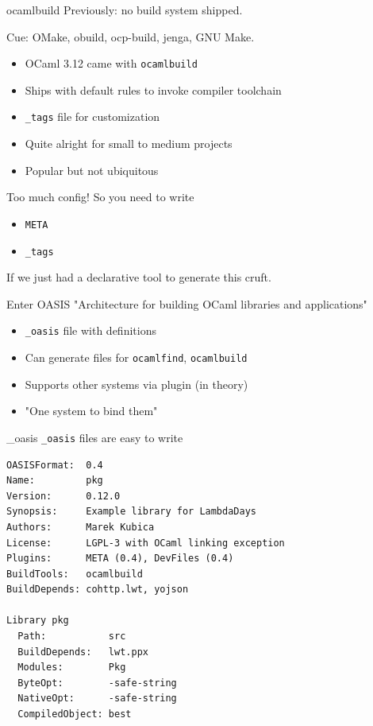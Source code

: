 \documentclass{beamer}
\begin{document}
\begin{frame}{ocamlbuild}
  Previously: no build system shipped.

  Cue: OMake, obuild, ocp-build, jenga, GNU Make.

  \begin{itemize}
    \item OCaml 3.12 came with \texttt{ocamlbuild}
    \item Ships with default rules to invoke compiler toolchain
    \item \texttt{\_tags} file for customization
    \item Quite alright for small to medium projects
    \item Popular but not ubiquitous
  \end{itemize}
\end{frame}

\begin{frame}{Too much config!}
  So you need to write

  \begin{itemize}
    \item \texttt{META}
    \item \texttt{\_tags}
  \end{itemize}

  If we just had a declarative tool to generate this cruft.
\end{frame}

\begin{frame}{Enter OASIS}
  "Architecture for building OCaml libraries and applications"

  \begin{itemize}
    \item \texttt{\_oasis} file with definitions
    \item Can generate files for \texttt{ocamlfind}, \texttt{ocamlbuild}
    \item Supports other systems via plugin (in theory)
    \item "One system to bind them"
  \end{itemize}
\end{frame}

\begin{frame}[fragile]{\_oasis}
  \texttt{\_oasis} files are easy to write
  \begin{verbatim}
OASISFormat:  0.4
Name:         pkg
Version:      0.12.0
Synopsis:     Example library for LambdaDays
Authors:      Marek Kubica
License:      LGPL-3 with OCaml linking exception
Plugins:      META (0.4), DevFiles (0.4)
BuildTools:   ocamlbuild
BuildDepends: cohttp.lwt, yojson

Library pkg
  Path:           src
  BuildDepends:   lwt.ppx
  Modules:        Pkg
  ByteOpt:        -safe-string
  NativeOpt:      -safe-string
  CompiledObject: best
  \end{verbatim}
\end{frame}
\end{document}
